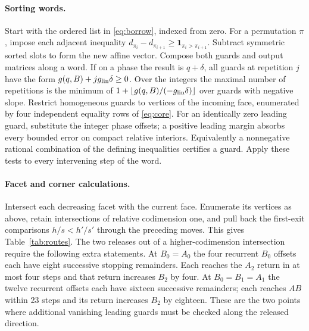 \documentclass[11pt,reqno]{amsart}
\begin{document}
\paragraph{Sorting words.}
Start with the ordered list in \eqref{eq:borrow}, indexed from zero.
For a permutation $\pi$, impose each adjacent inequality
$d_{\pi_i}-d_{\pi_{i+1}}\ge\boldsymbol1_{\pi_i>\pi_{i+1}}$.
Subtract symmetric sorted slots to form the new affine vector. Compose
both guards and output matrices along a word. If on a phase the result
is $q+\delta$, all guards at repetition $j$ have the form
$g(q,B)+jg_{\rm lin}\delta\ge0$. Over the integers the maximal number
of repetitions is the minimum of $1+\lfloor g(q,B)/(-g_{\rm lin}\delta)\rfloor$
over guards with negative slope. Restrict homogeneous guards to vertices
of the incoming face, enumerated by four independent equality rows of
\eqref{eq:core}. For an identically zero leading guard, substitute the
integer phase offsets; a positive leading margin absorbs every bounded
error on compact relative interiors. Equivalently a nonnegative rational
combination of the defining inequalities certifies a guard. Apply these
tests to every intervening step of the word.

\paragraph{Facet and corner calculations.}
Intersect each decreasing facet with the current face. Enumerate its vertices
as above, retain intersections of relative codimension one, and pull back
the first-exit comparisons $h/s<h'/s'$ through the preceding moves. This
gives Table~\ref{tab:routes}. The two releases out of a higher-codimension
intersection require the following extra statements. At $B_0=A_0$ the
four recurrent $B_0$ offsets each have eight successive stopping remainders.
Each reaches the $A_2$ return in at most four steps and that return increases
$B_2$ by four. At $B_0=B_1=A_1$ the twelve recurrent offsets each have
sixteen successive remainders; each reaches $AB$ within 23 steps and its
return increases $B_2$ by eighteen. These are the two points where
additional vanishing leading guards must be checked along the released
direction.
\end{document}
